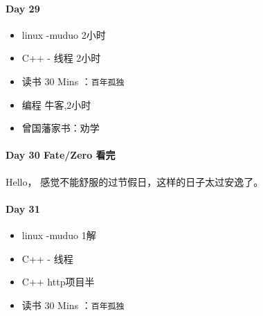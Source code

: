 \documentclass[UTF8,a4paper,8pt]{ctexart}
\begin{document}
	\paragraph{Day 29      \quad     }   
			\begin{itemize}[itemindent = 1em]
				\renewcommand\labelitemi{\makebox[0pt][l]{$\square$}\raisebox{.15ex}{\hspace{0.1em}$\checkmark$}}		
				\item   linux -muduo 2小时
				\item   C++ - 线程 2小时
				
				
				\renewcommand\labelitemi{\makebox[0pt][l]{$\square$}\hspace{1em}}
				\item   读书  30 Mins	：\verb|百年孤独|
				\item   编程  牛客,2小时
				
				
				\item  曾国藩家书：劝学
			\end{itemize}
	\paragraph{Day 30  Fate/Zero  看完  \quad     }
		Hello，  感觉不能舒服的过节假日，这样的日子太过安逸了。
		
	\paragraph{Day 31     \quad     }
		\begin{itemize}[itemindent = 1em]
			\renewcommand\labelitemi{\makebox[0pt][l]{$\square$}\raisebox{.15ex}{\hspace{0.1em}$\checkmark$}}		
			\item   linux -muduo 1解
			\item   C++ - 线程 
			\item   C++ http项目半
						
			\renewcommand\labelitemi{\makebox[0pt][l]{$\square$}\hspace{1em}}
			\item   读书  30 Mins	：\verb|百年孤独|
			
		\end{itemize}
\end{document}
